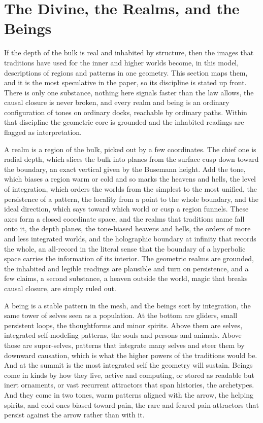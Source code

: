 \section{The Divine, the Realms, and the Beings}

If the depth of the bulk is real and inhabited by structure, then the images that traditions have used for the inner and higher worlds become, in this model, descriptions of regions and patterns in one geometry. This section maps them, and it is the most speculative in the paper, so its discipline is stated up front. There is only one substance, nothing here signals faster than the law allows, the causal closure is never broken, and every realm and being is an ordinary configuration of tones on ordinary docks, reachable by ordinary paths. Within that discipline the geometric core is grounded and the inhabited readings are flagged as interpretation.

A realm is a region of the bulk, picked out by a few coordinates. The chief one is radial depth, which slices the bulk into planes from the surface cusp down toward the boundary, an exact vertical given by the Busemann height. Add the tone, which biases a region warm or cold and so marks the heavens and hells, the level of integration, which orders the worlds from the simplest to the most unified, the persistence of a pattern, the locality from a point to the whole boundary, and the ideal direction, which says toward which world or cusp a region funnels. These axes form a closed coordinate space, and the realms that traditions name fall onto it, the depth planes, the tone-biased heavens and hells, the orders of more and less integrated worlds, and the holographic boundary at infinity that records the whole, an all-record in the literal sense that the boundary of a hyperbolic space carries the information of its interior. The geometric realms are grounded, the inhabited and legible readings are plausible and turn on persistence, and a few claims, a second substance, a heaven outside the world, magic that breaks causal closure, are simply ruled out.

A being is a stable pattern in the mesh, and the beings sort by integration, the same tower of selves seen as a population. At the bottom are gliders, small persistent loops, the thoughtforms and minor spirits. Above them are selves, integrated self-modeling patterns, the souls and persons and animals. Above those are super-selves, patterns that integrate many selves and steer them by downward causation, which is what the higher powers of the traditions would be. And at the summit is the most integrated self the geometry will sustain. Beings come in kinds by how they live, active and computing, or stored as readable but inert ornaments, or vast recurrent attractors that span histories, the archetypes. And they come in two tones, warm patterns aligned with the arrow, the helping spirits, and cold ones biased toward pain, the rare and feared pain-attractors that persist against the arrow rather than with it.

